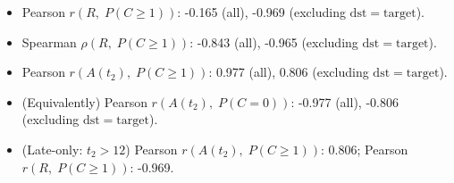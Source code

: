 \begin{itemize}
  \item Pearson $r(R,\;P(C\ge1))$: -0.165 (all), -0.969 (excluding $\mathrm{dst}=\mathrm{target}$).
  \item Spearman $\rho(R,\;P(C\ge1))$: -0.843 (all), -0.965 (excluding $\mathrm{dst}=\mathrm{target}$).
  \item Pearson $r(A(t_2),\;P(C\ge1))$: 0.977 (all), 0.806 (excluding $\mathrm{dst}=\mathrm{target}$).
  \item (Equivalently) Pearson $r(A(t_2),\;P(C=0))$: -0.977 (all), -0.806 (excluding $\mathrm{dst}=\mathrm{target}$).
  \item (Late-only: $t_2>12$) Pearson $r(A(t_2),\;P(C\ge1))$: 0.806; Pearson $r(R,\;P(C\ge1))$: -0.969.
\end{itemize}

